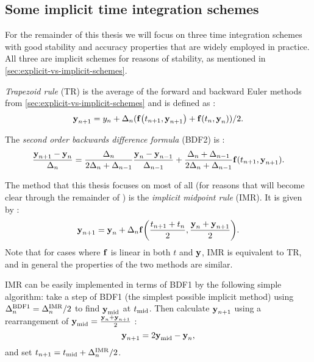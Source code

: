 \subsection{Some implicit time integration schemes}
\label{sec:some-implicit-time-integrators}

For the remainder of this thesis we will focus on three time integration schemes with good stability and accuracy properties that are widely employed in practice.
All three are implicit schemes for reasons of stability, as mentioned in \cref{sec:explicit-vs-implicit-schemes}.

\emph{Trapezoid rule} (TR) is the average of the forward and backward Euler methods from \cref{sec:explicit-vs-implicit-schemes} and is defined as \cite[260]{GreshoSani}:
\begin{equation}
  \boldsymbol{\mathrm{y}}_{n+1} = y_n + \Delta_{n} ({\boldsymbol{\mathrm{f}}{\left( t_{n+1}, \boldsymbol{\mathrm{y}}_{n+1} \right)}} + {\boldsymbol{\mathrm{f}}{\left( t_n, \boldsymbol{\mathrm{y}}_n \right)}})/2.
  \label{eq:tr-definition}
\end{equation}

The \emph{second order backwards difference formula} (BDF2) is \cite[715]{GreshoSani}:
\begin{equation}
  \label{eq:bdf2-definition}
  \frac{\boldsymbol{\mathrm{y}}_{n+1} - \boldsymbol{\mathrm{y}}_n}{\Delta_{n}} = \frac{\Delta_{n}}{2\Delta_{n} + \Delta_{n-1}} \frac{\boldsymbol{\mathrm{y}}_n - \boldsymbol{\mathrm{y}}_{n-1}}{\Delta_{n-1}}
  + \frac{\Delta_{n} + \Delta_{n-1}}{2\Delta_{n} + \Delta_{n-1}} {\boldsymbol{\mathrm{f}}}(t_{n+1}, \boldsymbol{\mathrm{y}}_{n+1}).
\end{equation}

The method that this thesis focuses on most of all (for reasons that will become clear through the remainder of ) is the \emph{implicit midpoint rule} (IMR).
It is given by \cite[263]{GreshoSani}:
\begin{equation}
  \label{eq:imr-definition}
  \boldsymbol{\mathrm{y}}_{n+1} = \boldsymbol{\mathrm{y}}_n + \Delta_{n} {\boldsymbol{\mathrm{f}}{\left( \frac{t_{n+1} + t_n}{2}, \frac{\boldsymbol{\mathrm{y}}_n + \boldsymbol{\mathrm{y}}_{n+1}}{2} \right)}}.
\end{equation}
Note that for cases where ${\boldsymbol{\mathrm{f}}}$ is linear in both $t$ and $\boldsymbol{\mathrm{y}}$, IMR is equivalent to TR, and in general the properties of the two methods are similar.

IMR can be easily implemented in terms of BDF1 by the following simple algorithm: take a step of BDF1 (the simplest possible implicit method) using $\Delta_{n}^{\mathrm{BDF1}} = \Delta_{n}^{\mathrm{IMR}}/2$ to find $\boldsymbol{\mathrm{y}}_{\mathrm{mid}}$ at $t_{\mathrm{mid}}$.
Then calculate $\boldsymbol{\mathrm{y}}_{n+1}$ using a rearrangement of $\boldsymbol{\mathrm{y}}_{\mathrm{mid}} = \frac{\boldsymbol{\mathrm{y}}_n + \boldsymbol{\mathrm{y}}_{n+1}}{2}$ \cite{Malidi2005}:
\begin{equation}
    \boldsymbol{\mathrm{y}}_{n+1} = 2\boldsymbol{\mathrm{y}}_{\mathrm{mid}} - \boldsymbol{\mathrm{y}}_n,
\end{equation}
and set $t_{n+1} = t_{\mathrm{mid}} + \Delta_{n}^{\mathrm{IMR}}/2$.

